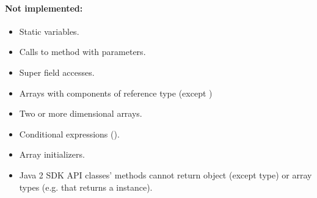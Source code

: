\paragraph{Not implemented:}
\begin{itemize}
\item Static variables.
\item Calls to  method with parameters.
\item Super field accesses.
\item Arrays with components of reference type (except )
\item Two or more dimensional arrays.
\item Conditional expressions ().
\item Array initializers.
\item Java 2 SDK API classes' methods cannot return object (except  type) or array types (e.g.  that returns a  instance).
\end{itemize}
